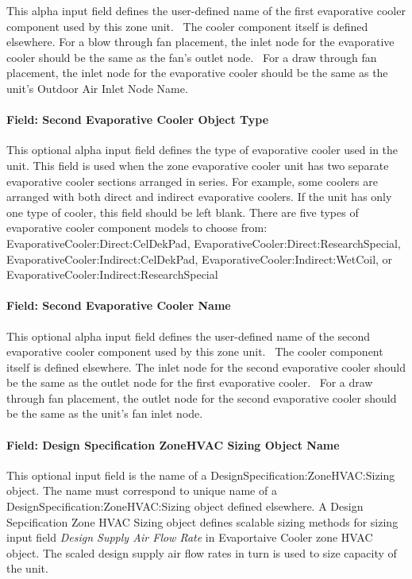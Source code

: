 This alpha input field defines the user-defined name of the first evaporative cooler component used by this zone unit.~ The cooler component itself is defined elsewhere. For a blow through fan placement, the inlet node for the evaporative cooler should be the same as the fan's outlet node.~ For a draw through fan placement, the inlet node for the evaporative cooler should be the same as the unit's Outdoor Air Inlet Node Name.

\paragraph{Field: Second Evaporative Cooler Object Type}\label{field-second-evaporative-cooler-object-type}

This optional alpha input field defines the type of evaporative cooler used in the unit. This field is used when the zone evaporative cooler unit has two separate evaporative cooler sections arranged in series. For example, some coolers are arranged with both direct and indirect evaporative coolers. If the unit has only one type of cooler, this field should be left blank. There are five types of evaporative cooler component models to choose from: EvaporativeCooler:Direct:CelDekPad, EvaporativeCooler:Direct:ResearchSpecial, EvaporativeCooler:Indirect:CelDekPad, EvaporativeCooler:Indirect:WetCoil, or EvaporativeCooler:Indirect:ResearchSpecial

\paragraph{Field: Second Evaporative Cooler Name}\label{field-second-evaporative-cooler-name}

This optional alpha input field defines the user-defined name of the second evaporative cooler component used by this zone unit.~ The cooler component itself is defined elsewhere. The inlet node for the second evaporative cooler should be the same as the outlet node for the first evaporative cooler.~ For a draw through fan placement, the outlet node for the second evaporative cooler should be the same as the unit's fan inlet node.

\paragraph{Field: Design Specification ZoneHVAC Sizing Object Name}\label{field-design-specification-zonehvac-sizing-object-name-4}

This optional input field is the name of a DesignSpecification:ZoneHVAC:Sizing object. The name must correspond to unique name of a DesignSpecification:ZoneHVAC:Sizing object defined elsewhere. A Design Sepcification Zone HVAC Sizing object defines scalable sizing methods for sizing input field \emph{Design Supply Air Flow Rate} in Evaportaive Cooler zone HVAC object. The scaled design supply air flow rates in turn is used to size capacity of the unit.

